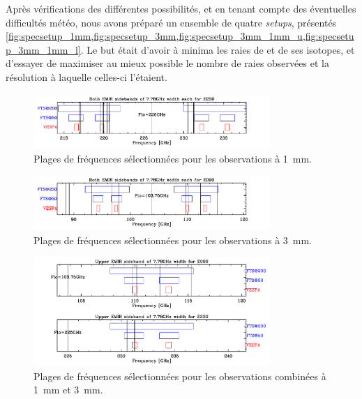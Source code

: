 \documentclass[a4paper,10pt,french]{article}
\newcommand{\troismm}{\SI{3}{\milli\meter}}
\newcommand{\unmm}{\SI{1}{\milli\meter}}
\begin{document}
Après vérifications des différentes possibilités, et en tenant compte des éventuelles
difficultés météo, nous avons préparé un ensemble de quatre \textit{setups},
présentés
\cref{fig:specsetup_1mm,fig:specsetup_3mm,fig:specsetup_3mm_1mm_u,fig:specsetup_3mm_1mm_l}.
Le but était d’avoir à minima les raies de  et de ses isotopes, et
d’essayer de maximiser au mieux possible le nombre de raies observées et la
résolution à laquelle celles-ci l’étaient.

\begin{figure}[ht]
    \centering
    \includegraphics[width=0.8\textwidth]{figures/specsetup-1mm.pdf}
    \caption{Plages de fréquences sélectionnées pour les observations à \unmm.}
    \label{fig:specsetup_1mm}
\end{figure}

\begin{figure}[ht]
    \centering
    \includegraphics[width=0.8\textwidth]{figures/specsetup-3mm.pdf}
    \caption{Plages de fréquences sélectionnées pour les observations à \troismm.}
    \label{fig:specsetup_3mm}
\end{figure}

\begin{figure}[ht]
    \centering
    \includegraphics[width=0.8\textwidth]{figures/specsetup-3mm-1mm-u.pdf}
    \caption{Plages de fréquences sélectionnées pour les observations combinées à \unmm{} et \troismm.}
    \label{fig:specsetup_3mm_1mm_u}
\end{figure}
\end{document}
